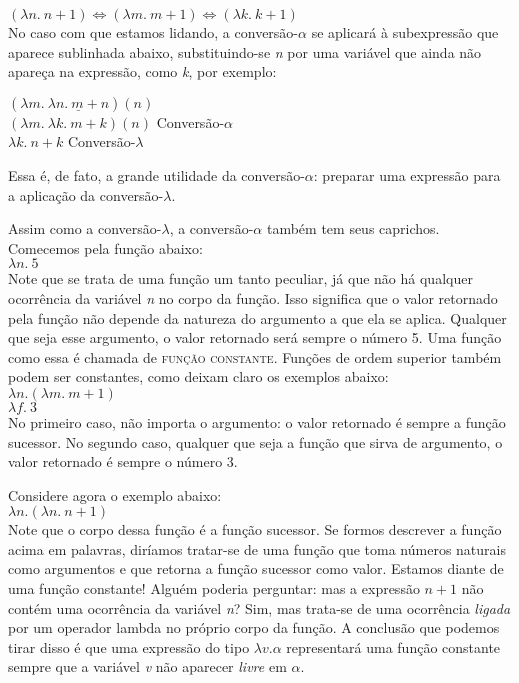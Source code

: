 \n $(\lambda n.\ n + 1) \Leftrightarrow (\lambda m.\ m + 1)
\Leftrightarrow (\lambda k.\ k + 1)$\\

\n No caso com que estamos lidando, a conversão-$\alpha$ se
aplicará à subexpressão que aparece sublinhada abaixo,
substituindo-se \textit{n} por uma variável que ainda não apareça
na expressão, como \textit{k}, por
exemplo:\\

\begin{exe}
	\ex $(\lambda m.\ \underline{\lambda n.\ m+n})(n)$\\
	$(\lambda m.\ \lambda k.\ m+k)(n)$ \hfill
	Conversão-$\alpha$\\
	$\lambda k.\ n+k$ \hfill Conversão-$\lambda$
\end{exe}

\n Essa é, de fato, a grande utilidade da conversão-$\alpha$:
preparar uma expressão para a aplicação da conversão-$\lambda$.

Assim como a conversão-$\lambda$, a conversão-$\alpha$ também tem seus caprichos. Comecemos pela função abaixo:\\

\n $\lambda n.\ 5$\\

\n Note que se trata de uma função um tanto peculiar, já que não
há qualquer ocorrência da variável \textit{n} no corpo da
função. Isso significa que o valor retornado pela função não
depende da natureza do argumento a que ela se aplica. Qualquer que
seja esse argumento, o valor retornado será sempre o número 5. Uma
função como essa é chamada de \textsc{função constante}.
Funções de ordem superior também podem ser constantes, como
deixam claro os
exemplos abaixo:\\

\n $\lambda n.(\lambda m.\ m+1)$\\

\n $\lambda f.\ 3$\\

\n No primeiro caso, não importa o argumento: o valor retornado é
sempre a função sucessor. No segundo caso, qualquer que seja a
função que sirva de argumento, o valor retornado é sempre o
número 3.

Considere agora o exemplo abaixo:\\

\n $\lambda n.(\lambda n.\ n+1)$\\

\n Note que o corpo dessa função é a função sucessor. Se
formos descrever a função acima em palavras, diríamos tratar-se
de uma função que toma números naturais como argumentos e que
retorna a função sucessor como valor. Estamos diante de uma
função constante! Alguém poderia perguntar: mas a expressão
$n+1$ não contém uma ocorrência da variável \textit{n}? Sim,
mas trata-se de uma ocorrência \textit{ligada} por um
operador lambda no próprio corpo da função. A conclusão que
podemos tirar disso é que uma expressão do tipo $\lambda v.
\alpha$ representará uma função constante sempre que a variável
\textit{v} não aparecer \textit{livre} em $\alpha$.

